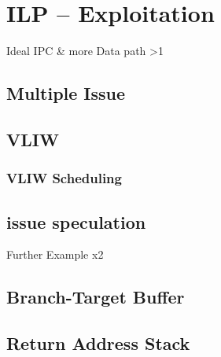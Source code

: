 \newpage
\section{ILP -- Exploitation}%
Ideal IPC \& more Data path >1

\subsection{Multiple Issue}

\subsection{VLIW}

\subsubsection{VLIW Scheduling}

\subsection{issue speculation}
Further Example x2


\subsection{Branch-Target Buffer}


\subsection{Return Address Stack}
